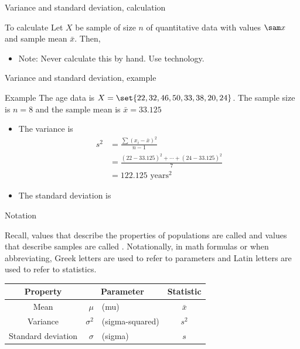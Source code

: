 \documentclass[xcolor=table, aspectratio=169, bigger, handout]{beamer}
\begin{document}
\begin{frame}{Variance and standard deviation, calculation}
\begin{block}{To calculate}
Let $X$ be sample of size $n$ of quantitative data with values $\sam x$ and sample mean $\bar x$. Then,\\
\smallskip
{}
\begin{itemize}
\pause\item Note: Never calculate this by hand. Use technology.
\end{itemize}
\end{block}
\end{frame}

\begin{frame}{Variance and standard deviation, example}
\begin{exampleblock}{Example}
The age data is $X = \set{22, 32, 46, 50, 33, 38, 20, 24}$. The sample size is $n=8$ and the sample mean is $\bar x = 33.125$
\begin{itemize}
\pause
\item The variance is \vspace{-.1in}
\begin{align*}
s^2 &= \frac{\sum (x_i - \bar x)^2}{n-1}\\
&= \frac{(22-33.125)^2 + \cdots + (24-33.125)^2}{7}\\
&= 122.125 \text{ years}^\text{2}
\end{align*} \vspace{-.2in}
\pause\item The standard deviation is\\ \smallskip
{}
\end{itemize}
\smallskip
\end{exampleblock}
\end{frame}


\begin{frame}{Notation}
\begin{block}{}
Recall, values that describe the properties of populations are called  and values that describe samples are called . Notationally, in math formulas or when abbreviating, Greek letters are used to refer to parameters and Latin letters are used to refer to statistics.
\pause
\begin{center}
\begin{tabular}{c |r l | c}
Property & \multicolumn{2}{c|}{Parameter} & Statistic\\
\hline
Mean & $\mu$ & (mu) & $\bar x$\\
Variance & $\sigma^2$ &(sigma-squared) & $s^2$\\
Standard deviation & $\sigma$ &(sigma) & $s$
\end{tabular}
\end{center} 
\end{block}
\end{frame}
\end{document}
